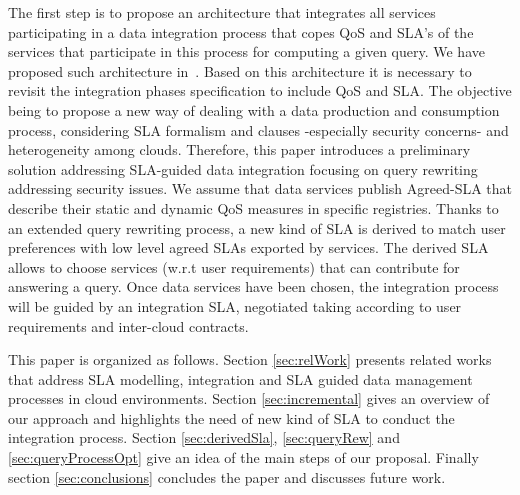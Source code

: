   The first step is to propose an architecture that integrates all services participating in a data integration process that copes QoS and SLA's of the services that participate in this process for computing a given query. 
  We have proposed such architecture in~\cite{BennaniGMV14}. Based on this architecture it is necessary to revisit  the integration phases  specification to include QoS and SLA. The objective being to  propose a new way of dealing with a data production and consumption process, considering SLA formalism and clauses -especially security concerns-  and heterogeneity among clouds. Therefore, this paper introduces a preliminary solution addressing SLA-guided data integration focusing  on query rewriting addressing security issues. We assume that data services publish Agreed-SLA that describe their  static and dynamic QoS measures in specific registries.  Thanks to an extended query rewriting process, a new kind of SLA is derived to match user preferences with low level agreed SLAs exported by services. The derived SLA allows to choose  services (w.r.t user requirements) that can contribute for answering a query. Once data services have been chosen, the integration process will be guided by an integration SLA, negotiated taking according to user requirements and inter-cloud contracts.

 
This paper is organized as follows. Section \ref{sec:relWork} presents related works that address SLA modelling, integration and SLA guided data management processes in cloud environments. Section \ref{sec:incremental} gives an overview of our approach and highlights the need of new kind of SLA to conduct the integration process. Section \ref{sec:derivedSla}, \ref{sec:queryRew} and \ref{sec:queryProcessOpt} give an idea of the main steps of our proposal.  Finally section  \ref{sec:conclusions} concludes the paper and discusses future work.









 